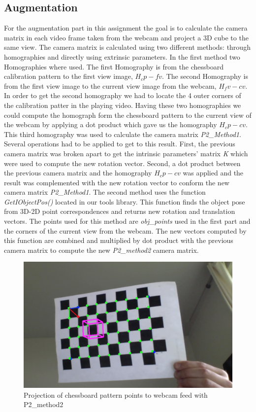 \subsection{Augmentation}
For the augmentation part in this assignment the goal is to calculate the camera matrix in each video frame taken from the webcam and project a 3D cube to the same view. The camera matrix is calculated using two different methods: through homographies and directly using extrinsic parameters. \newline
In the first method two Homographies where used. The first Homography is from the chessboard calibration pattern to the first view image, \(H_cp-fv\). The second Homography is from the first view image to the current view image from the webcam, \(H_fv-cv\). In order to get the second homography we had to locate the 4 outer corners of the calibration patter in the playing video. Having these two homographies we could compute the homograph form the chessboard pattern to the current view of the webcam by applying a dot product which gave us the homography \(H_cp-cv\). This third homography was used to calculate the camera matrix \textsl{P2\_Method1}. Several operations had to be applied to get to this result. First, the previous camera matrix was broken apart to get the intrinsic parameters' matrix \textsl{K} which were used to compute the new rotation vector. Second, a dot product between the previous camera matrix and the homography \(H_cp-cv\) was applied and the result was complemented with the new rotation vector to conform the new camera matrix \textsl{P2\_Method1}.\newline
The second method uses the function \textsl{GetIObjectPos()} located in our tools library. This function finds the object pose from 3D-2D point correspondences and returns new rotation and translation vectors. The points used for this method are \textsl{obj\_points} used in the first part and the corners of the current view from the webcam. The new vectors computed by this function are combined and multiplied by dot product with the previous camera matrix to compute the new \textsl{P2\_method2} camera matrix.
\begin{figure}
	\centering
	\includegraphics[scale=0.3]{images/p2_method2.jpg}
	\caption{Projection of chessboard pattern points to webcam feed with P2\_method2}
	\label{fig:method2}
\end{figure}

